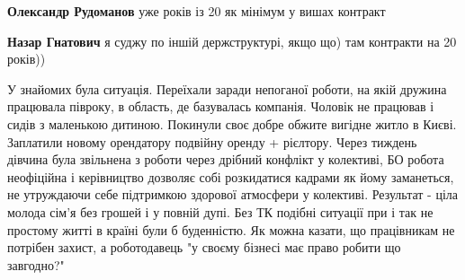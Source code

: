 \begin{itemize}
\begin{itemize}
\textbf{Олександр Рудоманов} уже років із 20 як мінімум у вишах контракт


\textbf{Назар Гнатович} я суджу по іншій держструктурі, якщо що) там контракти на 20 років))
\end{itemize} %


У знайомих була ситуація. Переїхали заради непоганої роботи, на якій дружина
працювала півроку, в область, де базувалась компанія. Чоловік не працював і
сидів з маленькою дитиною. Покинули своє добре обжите вигідне житло в Києві.
Заплатили новому орендатору подвійну оренду + рієлтору. Через тиждень дівчина
була звільнена з роботи через дрібний конфлікт у колективі, БО робота
неофіційна і керівництво дозволяє собі розкидатися кадрами як йому заманеться,
не утруждаючи себе підтримкою здорової атмосфери у колективі. Результат - ціла
молода сім'я без грошей і у повній дупі. Без ТК подібні ситуації при і так не
простому житті в країні були б буденністю. Як можна казати, що працівникам не
потрібен захист, а роботодавець "у своєму бізнесі має право робити що
завгодно?" 🤨

\end{itemize} %
